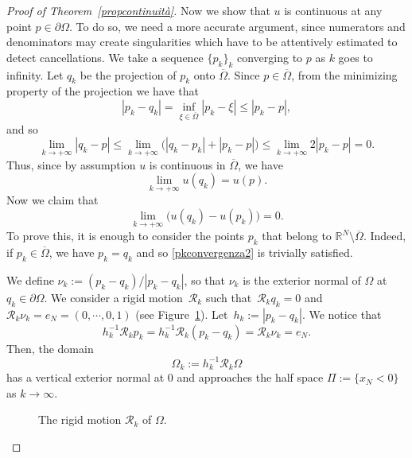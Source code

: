 \documentclass[10pt,a4paper]{amsart}
\def \R {\mathbb{R}}
\renewcommand{\leq}{\leqslant}
\begin{document}
\begin{proof}[Proof of Theorem~\ref{propcontinuità}]
Now we show that $u$ is continuous at any point 
$p\in \partial\Omega$.
To do so, we need a more accurate argument, since numerators and denominators
may create singularities which have to be attentively estimated to detect cancellations.
We take a sequence $\{p_k\}_k$
converging to $p$ as $k$ goes to infinity.
Let $q_k$ be the projection of $p_k$ onto $\overline{\Omega}$.
Since $p\in \overline{\Omega}$, from the minimizing property of the 
projection we have that 
\[
|p_k-q_k|=\inf_{\xi\in \overline{\Omega}}|p_k-\xi|
\leq |p_k-p|,
\]
and so
\[
\lim_{k\to +\infty}|q_k-p|
\leq \lim_{k\to +\infty}\big(|q_k-p_k|+|p_k-p|\big)
\leq \lim_{k\to +\infty} 2|p_k-p|=0.
\]
Thus, since by assumption $u$ is continuous in $\overline{\Omega}$,
we have
\begin{equation}\label{pkconvergenza1}
\lim_{k\to +\infty}u(q_k)=u(p).
\end{equation}
Now we claim that
\begin{equation}\label{pkconvergenza2}
\lim_{k\to +\infty}\big(u(q_k)-u(p_k)\big)=0.
\end{equation}
To prove this, it is enough to consider the points $p_k$ that belong
to $\R^N \setminus\overline{\Omega}$. Indeed, if 
$p_k\in \overline{\Omega}$, we have $p_k=q_k$ and so 
\eqref{pkconvergenza2} is trivially satisfied.

We define $\nu_k:=(p_k-q_k)/|p_k-q_k|$, so that $\nu_k$ is the 
exterior normal of $\Omega$ at $q_k\in \partial\Omega$.
We consider a rigid motion~$\mathcal{R}_k$ such that~$\mathcal{R}_k q_k=0$ and~$\mathcal{R}_k \nu_k=e_N=(0,\cdots,0,1)$ (see Figure~\ref{RK}).  Let~$h_k:=|p_k-q_k|$. We notice that
\begin{equation}\label{dovevapk}
h_k^{-1}\mathcal{R}_k p_k=
h_k^{-1}\mathcal{R}_k (p_k-q_k)=\mathcal{R}_k \nu_k=e_N.
\end{equation}
Then, the domain
\[
\Omega_k:=h_k^{-1}\mathcal{R}_k \Omega
\]
has a vertical exterior normal at 0 and approaches the half space
$\Pi:=\{x_N<0\}$ as $k\to \infty$.

\begin{figure}[h]
\begin{center}

\end{center}
\caption{The rigid motion $\mathcal R_k$ of $\Omega$.
}
\label{RK}
\end{figure}


\end{proof}
\end{document}
